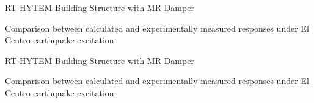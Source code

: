 \documentclass[usepdftitle=false]{beamer}
\begin{document}
\begin{frame}{RT-HYTEM Building Structure with MR Damper}
\begin{figure}[H]
\centering
\setcounter{subfigure}{0}
\label{fig:8-9}
\end{figure}
Comparison between calculated and experimentally measured responses under El Centro earthquake excitation.
\end{frame}


\begin{frame}{RT-HYTEM Building Structure with MR Damper}
\begin{figure}[H]
\centering
{}
\label{fig:8-9}
\end{figure}
Comparison between calculated and experimentally measured responses under El Centro earthquake excitation.
\end{frame}
\end{document}
